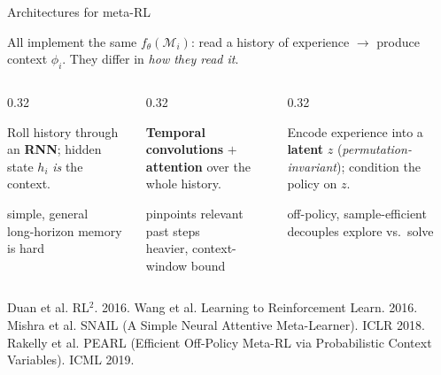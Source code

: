 \begin{frame}{Architectures for meta-RL}
\begin{center}\footnotesize
All implement the same $f_\theta(\mathcal{M}_i)$: read a history of experience
$\rightarrow$ produce context $\phi_i$. They differ in \emph{how they read it}.
\end{center}
\vspace{0.4em}
\begin{columns}[t]
\begin{column}{0.32\textwidth}
\begin{tcolorbox}[colback=sysblue!35, colframe=sysblue!80!black, title=\footnotesize\textbf{Recurrent} (RL$^2$)]
\footnotesize
Roll history through an \textbf{RNN}; hidden state $h_i$ \emph{is} the context.
\vspace{0.3em}

\empy{$+$} simple, general\\
\empy{$-$} long-horizon memory is hard
\end{tcolorbox}
\end{column}
\begin{column}{0.32\textwidth}
\begin{tcolorbox}[colback=boxgreen!45, colframe=boxgreen!70!black, title=\footnotesize\textbf{Attentive} (SNAIL)]
\footnotesize
\textbf{Temporal convolutions} $+$ \textbf{attention} over the whole history.
\vspace{0.3em}

\empy{$+$} pinpoints relevant past steps\\
\empy{$-$} heavier, context-window bound
\end{tcolorbox}
\end{column}
\begin{column}{0.32\textwidth}
\begin{tcolorbox}[colback=boxtan!50, colframe=boxtan!80!black, title=\footnotesize\textbf{Context encoder} (PEARL)]
\footnotesize
Encode experience into a \textbf{latent} $z$ (\emph{permutation-invariant}); condition
the policy on $z$.
\vspace{0.3em}

\empy{$+$} off-policy, sample-efficient\\
\empy{$-$} decouples explore vs.\ solve
\end{tcolorbox}
\end{column}
\end{columns}
\vfill
{\tiny Duan et al. RL$^2$. 2016. \;\textbullet\; Wang et al. Learning to Reinforcement Learn. 2016.
\;\textbullet\; Mishra et al. SNAIL (A Simple Neural Attentive Meta-Learner). ICLR 2018.
\;\textbullet\; Rakelly et al. PEARL (Efficient Off-Policy Meta-RL via Probabilistic Context Variables). ICML 2019.}
\end{frame}
